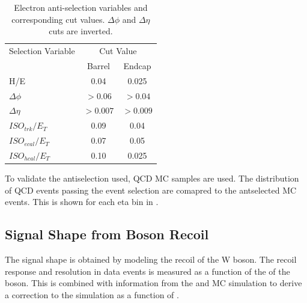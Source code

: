 \begin{table}[htbp]
  \begin{center}
    \leavevmode
    \begin{tabular}{lcc} 
    \toprule
      Selection Variable & \multicolumn{2}{c}{Cut Value}\\
                         & Barrel & Endcap\\
    \midrule
        H/E & 0.04 & 0.025 \\
        $\Delta\phi$ & $>0.06$  & $>0.04$ \\
        $\Delta\eta$ & $>0.007$ & $>0.009$\\
        $ISO_{trk} / E_T $ & 0.09 & 0.04 \\
        $ISO_{ecal}/ E_T$  & 0.07 & 0.05 \\
        $ISO_{hcal}/ E_T$  & 0.10 & 0.025\\ 
    \bottomrule
    \end{tabular}
    \caption{\label{tab:antisel}Electron anti-selection variables and corresponding cut values. $\Delta\phi$ and $\Delta\eta$ cuts are inverted.}
  \end{center}
\end{table}

To validate the antiselection used, \ac{QCD} \ac{MC} samples are used. The
distribution of \ac{QCD} events passing the event selection are comapred to the
antselected MC events. This is shown for each eta bin in
.

\subsection{Signal \ETm Shape from Boson Recoil}
\label{sec:recoil}
The signal \ETm shape is obtained by modeling the recoil of the W boson. 
The recoil response and resolution in \HepProcess{\PZ\to\Plepton\Plepton} data
events is measured as a function of the \pT of the boson. This is combined with
information from the \PW and \PZ \ac{MC} simulation to derive a correction to
the simulation \ETm as a function of \PW \pT.


